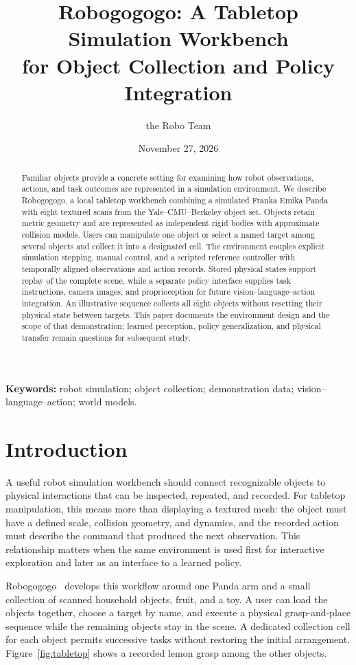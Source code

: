 \documentclass[10pt]{article}
\title{Robogogogo: A Tabletop Simulation Workbench\\for Object Collection and Policy Integration}
\author{the Robo Team}
\date{November 27, 2026}
\begin{document}
\maketitle
\begin{abstract}
Familiar objects provide a concrete setting for examining how robot observations, actions, and task outcomes are represented in a simulation environment. We describe Robogogogo, a local tabletop workbench combining a simulated Franka Emika Panda with eight textured scans from the Yale--CMU--Berkeley object set. Objects retain metric geometry and are represented as independent rigid bodies with approximate collision models. Users can manipulate one object or select a named target among several objects and collect it into a designated cell. The environment couples explicit simulation stepping, manual control, and a scripted reference controller with temporally aligned observations and action records. Stored physical states support replay of the complete scene, while a separate policy interface supplies task instructions, camera images, and proprioception for future vision--language--action integration. An illustrative sequence collects all eight objects without resetting their physical state between targets. This paper documents the environment design and the scope of that demonstration; learned perception, policy generalization, and physical transfer remain questions for subsequent study.
\end{abstract}
\noindent\textbf{Keywords:} robot simulation; object collection; demonstration data; vision--language--action; world models.

\section{Introduction}
A useful robot simulation workbench should connect recognizable objects to physical interactions that can be inspected, repeated, and recorded. For tabletop manipulation, this means more than displaying a textured mesh: the object must have a defined scale, collision geometry, and dynamics, and the recorded action must describe the command that produced the next observation. This relationship matters when the same environment is used first for interactive exploration and later as an interface to a learned policy.

Robogogogo~\cite{robogogogo} develops this workflow around one Panda arm and a small collection of scanned household objects, fruit, and a toy. A user can load the objects together, choose a target by name, and execute a physical grasp-and-place sequence while the remaining objects stay in the scene. A dedicated collection cell for each object permits successive tasks without restoring the initial arrangement. Figure~\ref{fig:tabletop} shows a recorded lemon grasp among the other objects.
\end{document}
